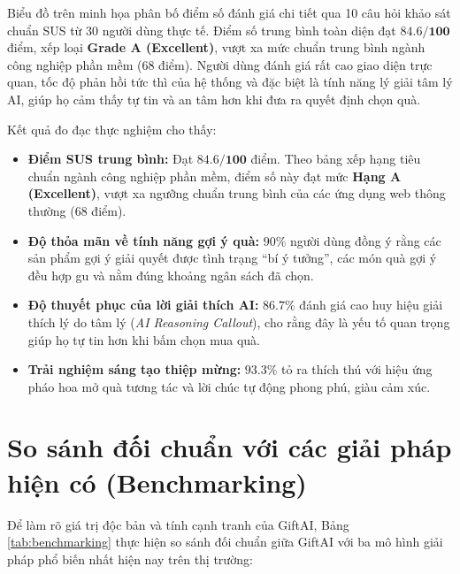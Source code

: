 Biểu đồ trên minh họa phân bố điểm số đánh giá chi tiết qua 10 câu hỏi khảo sát chuẩn SUS từ 30 người dùng thực tế. Điểm số trung bình toàn diện đạt $\mathbf{84.6 / 100}$ điểm, xếp loại \textbf{Grade A (Excellent)}, vượt xa mức chuẩn trung bình ngành công nghiệp phần mềm ($68$ điểm). Người dùng đánh giá rất cao giao diện trực quan, tốc độ phản hồi tức thì của hệ thống và đặc biệt là tính năng lý giải tâm lý AI, giúp họ cảm thấy tự tin và an tâm hơn khi đưa ra quyết định chọn quà.

Kết quả đo đạc thực nghiệm cho thấy:
\begin{itemize}
    \item \textbf{Điểm SUS trung bình:} Đạt $\mathbf{84.6 / 100}$ điểm. Theo bảng xếp hạng tiêu chuẩn ngành công nghiệp phần mềm, điểm số này đạt mức \textbf{Hạng A (Excellent)}, vượt xa ngưỡng chuẩn trung bình của các ứng dụng web thông thường ($68$ điểm).
    \item \textbf{Độ thỏa mãn về tính năng gợi ý quà:} $90\%$ người dùng đồng ý rằng các sản phẩm gợi ý giải quyết được tình trạng ``bí ý tưởng'', các món quà gợi ý đều hợp gu và nằm đúng khoảng ngân sách đã chọn.
    \item \textbf{Độ thuyết phục của lời giải thích AI:} $86.7\%$ đánh giá cao huy hiệu giải thích lý do tâm lý (\textit{AI Reasoning Callout}), cho rằng đây là yếu tố quan trọng giúp họ tự tin hơn khi bấm chọn mua quà.
    \item \textbf{Trải nghiệm sáng tạo thiệp mừng:} $93.3\%$ tỏ ra thích thú với hiệu ứng pháo hoa mở quà tương tác và lời chúc tự động phong phú, giàu cảm xúc.
\end{itemize}

\section{So sánh đối chuẩn với các giải pháp hiện có (Benchmarking)}

Để làm rõ giá trị độc bản và tính cạnh tranh của GiftAI, Bảng \ref{tab:benchmarking} thực hiện so sánh đối chuẩn giữa GiftAI với ba mô hình giải pháp phổ biến nhất hiện nay trên thị trường:


